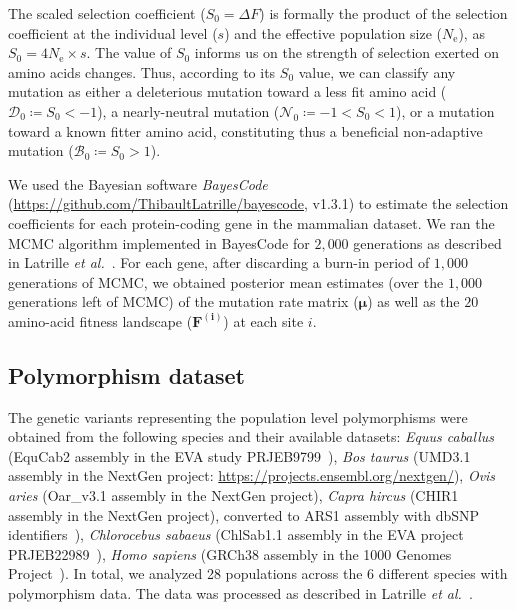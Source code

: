 \documentclass{article}
\newcommand{\UniDimArray}[1]{\bm{#1}}
\newcommand{\Ne}{N_{\text{e}}}
\newcommand{\Sphy}{S_{0}}
\newcommand{\SphyDel}{\mathcal{D}_0}
\newcommand{\SphyNeu}{\mathcal{N}_0}
\newcommand{\SphyBen}{\mathcal{B}_0}
\begin{document}
    The scaled selection coefficient ($\Sphy = \Delta F$) is formally the product of the selection coefficient at the individual level ($s$) and the effective population size ($\Ne$), as $\Sphy = 4 \Ne \times s$. The value of $\Sphy$ informs us on the strength of selection exerted on amino acids changes.
    Thus, according to its $\Sphy$ value, we can classify any mutation as either a deleterious mutation toward a less fit amino acid ($\SphyDel \coloneqq \Sphy < -1$), a nearly-neutral mutation ($\SphyNeu \coloneqq -1 < \Sphy <1$), or a mutation toward a known fitter amino acid, constituting thus a beneficial non-adaptive mutation ($\SphyBen \coloneqq \Sphy > 1$).

    We used the Bayesian software \textit{BayesCode} (\url{https://github.com/ThibaultLatrille/bayescode}, v1.3.1) to estimate the selection coefficients for each protein-coding gene in the mammalian dataset.
    We ran the MCMC algorithm implemented in BayesCode for $2,000$ generations as described in Latrille \textit{et al.}~\cite{latrille_genes_2023}.
    For each gene, after discarding a burn-in period of $1,000$ generations of MCMC, we obtained posterior mean estimates (over the $1,000$ generations left of MCMC) of the mutation rate matrix ($\UniDimArray{\mu}$) as well as the $20$ amino-acid fitness landscape ($\UniDimArray{F^{(i)}}$) at each site $i$.

    \subsection{Polymorphism dataset}
    \label{subsec:polymorphism-dataset}

    The genetic variants representing the population level polymorphisms were obtained from the following species and their available datasets: \textit{Equus caballus} (EquCab2 assembly in the EVA study PRJEB9799~\cite{alabri_whole_2020}), \textit{Bos taurus} (UMD3.1 assembly in the NextGen project: \url{https://projects.ensembl.org/nextgen/}), \textit{Ovis aries} (Oar\_v3.1 assembly in the NextGen project), \textit{Capra hircus} (CHIR1 assembly in the NextGen project), converted to ARS1 assembly with dbSNP identifiers~\cite{sherry_dbsnp_2001}), \textit{Chlorocebus sabaeus} (ChlSab1.1 assembly in the EVA project PRJEB22989~\cite{svardal_ancient_2017}), \textit{Homo sapiens} (GRCh38 assembly in the 1000 Genomes Project~\cite{zheng-bradley_alignment_2017}).
    In total, we analyzed 28 populations across the 6 different species with polymorphism data.
    The data was processed as described in Latrille \textit{et al.}~\cite{latrille_genes_2023}.
\end{document}
